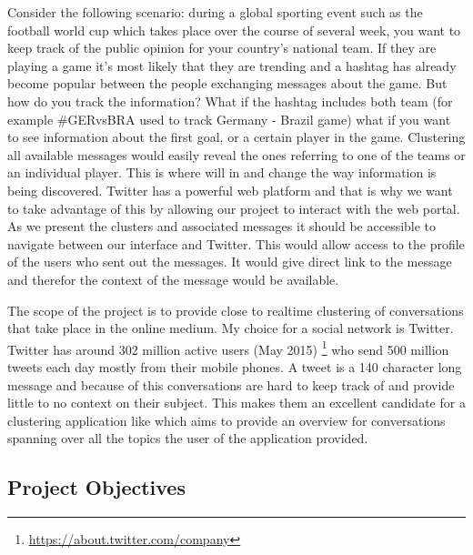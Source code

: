 \newline
\newline
Consider the following scenario: during a global sporting event such as the football world cup which takes place over the course of several week, you want to keep track of the public opinion for your country's national team. If they are playing a game it's most likely that they are trending and a hashtag has already become popular between the people exchanging messages about the game. But how do you track the information? What if the hashtag includes both team (for example \#GERvsBRA used to track Germany - Brazil game) what if you want to see information about the first goal, or a certain player in the game. Clustering all available messages would easily reveal the ones referring to one of the teams or an individual player. This is where {\project}  will in and change the way information is being discovered.
\newline
\newline
Twitter has a powerful web platform and that is why we want to take advantage of this by allowing our project to interact with the web portal. As we present the clusters and associated messages it should be accessible to navigate between our interface and Twitter. This would allow access to the profile of the users who sent out the messages. It would give direct link to the message and therefor the context of the message would be available.

The scope of the project \textbf{\project} is to provide close to realtime 
clustering of conversations that take place in the online medium. My choice for
a social network is Twitter. Twitter has around 302 million active users (May 2015)
\footnote{\url{https://about.twitter.com/company}} who send 500 million tweets
each day mostly from their mobile phones. A tweet is a 140 character long message
and because of this conversations are hard to keep track of and provide little to
no context on their subject. This makes them an excellent candidate for a clustering application like \textbf{\project} which aims to provide an overview for  
conversations spanning over all the topics the user of the application provided.

\subsection{Project Objectives}
\label{sub-sec:proj-objectives}

